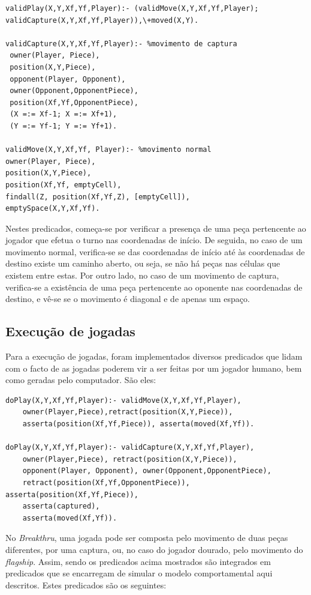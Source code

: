 \documentclass[a4paper]{article}
\begin{document}
\begin{verbatim}
validPlay(X,Y,Xf,Yf,Player):- (validMove(X,Y,Xf,Yf,Player);
validCapture(X,Y,Xf,Yf,Player)),\+moved(X,Y).

validCapture(X,Y,Xf,Yf,Player):- %movimento de captura
 owner(Player, Piece),
 position(X,Y,Piece),
 opponent(Player, Opponent),
 owner(Opponent,OpponentPiece),
 position(Xf,Yf,OpponentPiece),
 (X =:= Xf-1; X =:= Xf+1),
 (Y =:= Yf-1; Y =:= Yf+1).

validMove(X,Y,Xf,Yf, Player):- %movimento normal
owner(Player, Piece),
position(X,Y,Piece),
position(Xf,Yf, emptyCell),
findall(Z, position(Xf,Yf,Z), [emptyCell]),
emptySpace(X,Y,Xf,Yf).
\end{verbatim}

Nestes predicados, começa-se por verificar a presença de uma peça pertencente ao jogador que efetua o turno nas coordenadas de início. De seguida, no caso de um movimento normal, verifica-se se das coordenadas de início até às coordenadas de destino existe um caminho aberto, ou seja, se não há peças nas células que existem entre estas. Por outro lado, no caso de um movimento de captura, verifica-se a existência de uma peça pertencente ao oponente nas coordenadas de destino, e vê-se se o movimento é diagonal e de apenas um espaço.

\subsection{Execução de jogadas}
Para a execução de jogadas, foram implementados diversos predicados que lidam com o facto de as jogadas poderem vir a ser feitas por um jogador humano, bem como geradas pelo computador. São eles:

\begin{verbatim}
doPlay(X,Y,Xf,Yf,Player):- validMove(X,Y,Xf,Yf,Player),
	owner(Player,Piece),retract(position(X,Y,Piece)),
	asserta(position(Xf,Yf,Piece)), asserta(moved(Xf,Yf)).

doPlay(X,Y,Xf,Yf,Player):- validCapture(X,Y,Xf,Yf,Player),
	owner(Player,Piece), retract(position(X,Y,Piece)),
	opponent(Player, Opponent), owner(Opponent,OpponentPiece),
	retract(position(Xf,Yf,OpponentPiece)), asserta(position(Xf,Yf,Piece)),
	asserta(captured),
	asserta(moved(Xf,Yf)).

\end{verbatim}

No \textit{Breakthru}, uma jogada pode ser composta pelo movimento de duas peças diferentes, por uma captura, ou, no caso do jogador dourado, pelo movimento do \textit{flagship}. Assim, sendo os predicados acima mostrados são integrados em predicados que se encarregam de simular o modelo comportamental aqui descritos. Estes predicados são os seguintes:
\end{document}

